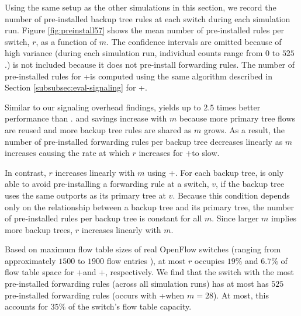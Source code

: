 Using the same setup as the other simulations in this section, we record the number of pre-installed backup tree rules at each switch during each simulation run.  
Figure \ref{fig:preinstall57} shows the mean number of pre-installed rules per switch, $r$, as a function of $m$. 
The confidence intervals are omitted because of high variance (during each simulation run, individual counts range from $0$ to $525$.) 
\post is not included because it does not pre-install forwarding rules.  The number of pre-installed rules for \pres+\lb is computed using the same algorithm described in Section 
\ref{subsubsec:eval-signaling} for \posts+\lbs. %

Similar to our \post signaling overhead findings, \merge yields up to $2.5$ times better performance than \bases.
\merge and \lb savings increase with $m$ because more primary tree flows are reused and more backup tree rules are shared as $m$ grows.
As a result, the number of pre-installed forwarding rules per backup tree decreases linearly as $m$ increases causing the rate at which $r$ increases for \pres+\merge to slow.

In contrast, $r$ increases linearly with $m$ using \pres+\bases. For each backup tree, \base is only able to avoid pre-installing a forwarding rule at a switch, $v$,
if the backup tree uses the same outports as its primary tree at $v$.  Because this condition depends only on the relationship between a backup tree and its primary tree, the number of
pre-installed rules per backup tree is constant for all $m$.  Since larger $m$ implies more backup trees, $r$ increases linearly with $m$.   

Based on maximum flow table sizes of real OpenFlow switches (ranging from approximately $1500$ to $1900$ flow entries \cite{Curtis11,Ferguson13}), at most $r$ occupies  
$19\%$ and $6.7\%$ of flow table space for \pres+\base and \pres+\merges, respectively.  We find that the switch with the most pre-installed forwarding rules (across all simulation runs) 
has at most has $525$ pre-installed forwarding rules (occurs with \pres+\base when $m=28$).  At most, this accounts for $35\%$ of the switch's flow table capacity. %



